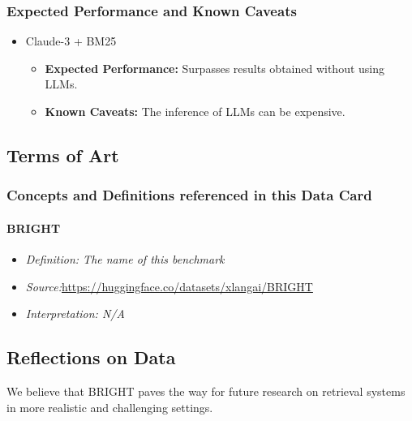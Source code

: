 \subsubsection{Expected Performance and Known Caveats}
\begin{itemize}
    \item Claude-3 + BM25
    \begin{itemize}
        \item \textbf{Expected Performance:} Surpasses results obtained without using LLMs.
        \item \textbf{Known Caveats:} The inference of LLMs can be expensive.
    \end{itemize}
\end{itemize}

\subsection{Terms of Art}
\subsubsection{Concepts and Definitions referenced in this Data Card}
\paragraph{BRIGHT}
\begin{itemize}
\item \textit{Definition: The name of this benchmark}
\item \textit{Source:}\url{https://huggingface.co/datasets/xlangai/BRIGHT}
\item \textit{Interpretation: N/A}
\end{itemize}

\subsection{Reflections on Data}
We believe that BRIGHT paves the way for future research on retrieval systems in more realistic and challenging settings.

